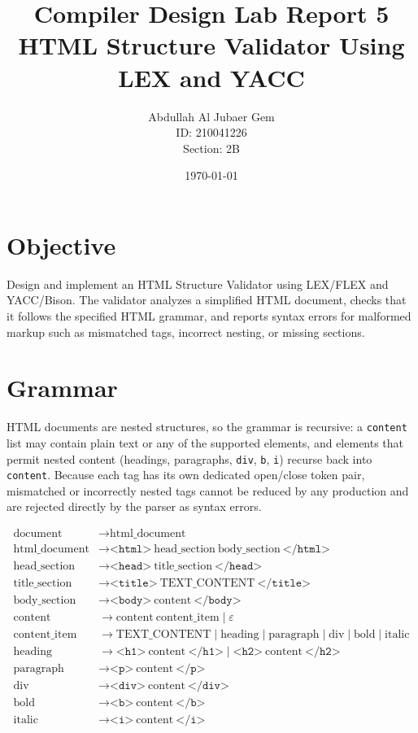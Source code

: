 \documentclass{article}
\title{Compiler Design Lab Report 5\\HTML Structure Validator Using LEX and YACC}
\author{Abdullah Al Jubaer Gem\\ID: 210041226\\Section: 2B}
\date{\today}
\begin{document}
\maketitle

\section{Objective}
Design and implement an HTML Structure Validator using LEX/FLEX and YACC/Bison. The validator analyzes a simplified HTML document, checks that it follows the specified HTML grammar, and reports syntax errors for malformed markup such as mismatched tags, incorrect nesting, or missing sections.

\section{Grammar}
HTML documents are nested structures, so the grammar is recursive: a \texttt{content} list may contain plain text or any of the supported elements, and elements that permit nested content (headings, paragraphs, \texttt{div}, \texttt{b}, \texttt{i}) recurse back into \texttt{content}. Because each tag has its own dedicated open/close token pair, mismatched or incorrectly nested tags cannot be reduced by any production and are rejected directly by the parser as syntax errors.

\begin{align*}
\text{document}      &\rightarrow \text{html\_document} \\
\text{html\_document}&\rightarrow \texttt{<html>}\ \text{head\_section}\ \text{body\_section}\ \texttt{</html>} \\
\text{head\_section} &\rightarrow \texttt{<head>}\ \text{title\_section}\ \texttt{</head>} \\
\text{title\_section}&\rightarrow \texttt{<title>}\ \text{TEXT\_CONTENT}\ \texttt{</title>} \\
\text{body\_section} &\rightarrow \texttt{<body>}\ \text{content}\ \texttt{</body>} \\
\text{content}       &\rightarrow \text{content}\ \text{content\_item} \mid \varepsilon \\
\text{content\_item} &\rightarrow \text{TEXT\_CONTENT} \mid \text{heading} \mid \text{paragraph} \mid \text{div} \mid \text{bold} \mid \text{italic} \\
\text{heading}       &\rightarrow \texttt{<h1>}\ \text{content}\ \texttt{</h1>} \mid \texttt{<h2>}\ \text{content}\ \texttt{</h2>} \\
\text{paragraph}     &\rightarrow \texttt{<p>}\ \text{content}\ \texttt{</p>} \\
\text{div}           &\rightarrow \texttt{<div>}\ \text{content}\ \texttt{</div>} \\
\text{bold}          &\rightarrow \texttt{<b>}\ \text{content}\ \texttt{</b>} \\
\text{italic}        &\rightarrow \texttt{<i>}\ \text{content}\ \texttt{</i>}
\end{align*}
\end{document}
